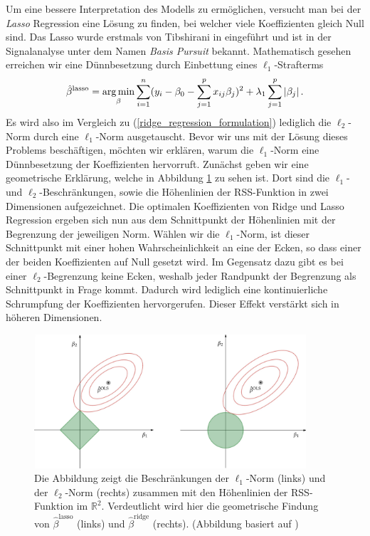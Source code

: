 Um eine bessere Interpretation des Modells zu ermöglichen, versucht man bei der \textit{Lasso} Regression eine Lösung zu finden, bei welcher viele Koeffizienten gleich Null sind. Das Lasso wurde erstmals von Tibshirani in \cite{tibshirani_lasso} eingeführt und ist in der Signalanalyse unter dem Namen \textit{Basis Pursuit} \cite{chen} bekannt. Mathematisch gesehen erreichen wir eine Dünnbesetzung durch Einbettung eines $\ell_1$-Strafterms
\begin{align}
\label{lasso_formulation}
\hat{\beta}^{\text{lasso}} = \operatorname*{arg\,min}_{\beta} \sum_{i=1}^{n}(y_i - \beta_0 - \sum_{j=1}^p x_{ij}\beta_j)^2 + \lambda_1\sum_{j=1}^p \left|\beta_j\right|.
\end{align}
Es wird also im Vergleich zu (\ref{ridge_regression_formulation}) lediglich die $\ell_2$-Norm durch eine $\ell_1$-Norm ausgetauscht. Bevor wir uns mit der Lösung dieses Problems beschäftigen, möchten wir erklären, warum die $\ell_1$-Norm eine Dünnbesetzung der Koeffizienten hervorruft. Zunächst geben wir eine geometrische Erklärung, welche in Abbildung \ref{lasso_ridge_regression_figure} zu sehen ist. Dort sind die $\ell_1$- und $\ell_2$-Beschränkungen, sowie die Höhenlinien der RSS-Funktion in zwei Dimensionen aufgezeichnet. Die optimalen Koeffizienten von Ridge und Lasso Regression ergeben sich nun aus dem Schnittpunkt der Höhenlinien mit der Begrenzung der jeweiligen Norm. Wählen wir die $\ell_1$-Norm, ist dieser Schnittpunkt mit einer hohen Wahrscheinlichkeit an eine der Ecken, so dass einer der beiden Koeffizienten auf Null gesetzt wird. Im Gegensatz dazu gibt es bei einer $\ell_2$-Begrenzung keine Ecken, weshalb jeder Randpunkt der Begrenzung als Schnittpunkt in Frage kommt. Dadurch wird lediglich eine kontinuierliche Schrumpfung der Koeffizienten hervorgerufen. Dieser Effekt verstärkt sich in höheren Dimensionen.

\begin{figure}
\centering
\includegraphics[width = 0.9\textwidth]{figures/lasso_ridge_regression.jpg}
\caption{Die Abbildung zeigt die Beschränkungen der $\ell_1$-Norm (links) und der $\ell_2$-Norm (rechts) zusammen mit den Höhenlinien der RSS-Funktion im $\mathbb{R}^2$. Verdeutlicht wird hier die geometrische Findung von $\hat{\beta}^{\text{lasso}}$ (links) und $\hat{\beta}^{\text{ridge}}$ (rechts). (Abbildung basiert auf \cite{hastie_elements})}
\label{lasso_ridge_regression_figure}
\end{figure}


